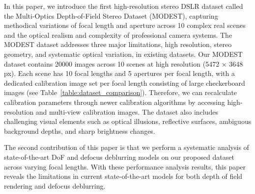 


In this paper, we introduce the first high-resolution stereo DSLR dataset called the Multi-Optics Depth-of-Field Stereo Dataset (MODEST), capturing methodical variations of focal length and aperture across 10 complex real scenes and the optical realism and complexity of professional camera systems. The MODEST dataset addresses three major limitations, high resolution, stereo geometry, and systematic optical variation, in existing datasets. Our MODEST dataset contains 20000 images across 10 scenes at high resolution (5472 $\times$ 3648 px). Each scene has 10 focal lengths and 5 apertures per focal length, with a dedicated calibration image set per focal length consisting of large checkerboard images (see Table~\ref{table:dataset_comparison}). Therefore, we can recalculate calibration parameters through newer calibration algorithms by accessing high-resolution and multi-view calibration images. The dataset also includes challenging visual elements such as optical illusions, reflective surfaces, ambiguous background depths, and sharp brightness changes.

The second contribution of this paper is that we perform a systematic analysis of state-of-the-art DoF and defocus deblurring models on our proposed dataset across varying focal lengths. With these performance analysis results, this paper reveals the limitations in current state-of-the-art models for both depth of field rendering and defocus deblurring.

